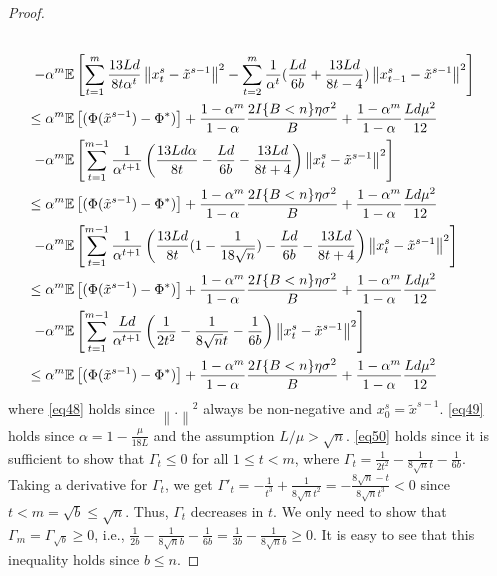 \documentclass{article}
\newcommand*{\E}{\mathbb{E}}
\newcommand{\norm}[1]{\left\lVert#1\right\rVert}
\theoremstyle{definition}
\theoremstyle{remark}
\begin{document}
\begin{proof}
{\begin{align}
\\-\alpha^m\E&\left[\sum_{t=1}^m\frac{13Ld}{8t\alpha^t}\norm{{x}_t^s-\tilde{x}^{s-1}}^2-\sum_{t=2}^m\frac{1}{\alpha^t}(\frac{Ld}{6b}+\frac{13Ld}{8t-4}) \norm{x_{t-1}^s-\tilde{x}^{s-1}}^2 \right]\label{eq48}\\
\leq\alpha^m\E&\left[(\Phi(\tilde{x}^{s-1}) - \Phi^*)\right] + \frac{1-\alpha^m}{1-\alpha}\frac{2I\{B < n\}\eta \sigma ^2}{B}+\frac{1-\alpha^m}{1-\alpha}\frac{L d \mu^2}{12}\notag
\\-\alpha^m\E&\left[\sum_{t=1}^{m-1}\frac{1}{\alpha^{t+1}}\left(\frac{13Ld\alpha}{8t}-\frac{Ld}{6b} - \frac{13Ld}{8t+4}\right) \norm{x_{t}^s-\tilde{x}^{s-1}}^2 \right]\notag\\
\leq\alpha^m\E&\left[(\Phi(\tilde{x}^{s-1}) - \Phi^*)\right] + \frac{1-\alpha^m}{1-\alpha}\frac{2I\{B < n\}\eta \sigma ^2}{B}+\frac{1-\alpha^m}{1-\alpha}\frac{L d \mu^2}{12}\notag
\\-\alpha^m\E&\left[\sum_{t=1}^{m-1}\frac{1}{\alpha^{t+1}}\left(\frac{13Ld}{8t}(1-\frac{1}{18\sqrt{n}})-\frac{Ld}{6b} - \frac{13Ld}{8t+4}\right) \norm{x_{t}^s-\tilde{x}^{s-1}}^2 \right]\label{eq49}\\
\leq\alpha^m\E&\left[(\Phi(\tilde{x}^{s-1}) - \Phi^*)\right] + \frac{1-\alpha^m}{1-\alpha}\frac{2I\{B < n\}\eta \sigma ^2}{B}+\frac{1-\alpha^m}{1-\alpha}\frac{L d \mu^2}{12}\notag
\\-\alpha^m\E&\left[\sum_{t=1}^{m-1}\frac{Ld}{\alpha^{t+1}}\left(\frac{1}{2t^2}-\frac{1}{8\sqrt{n}t}-\frac{1}{6b} \right) \norm{x_{t}^s-\tilde{x}^{s-1}}^2 \right]\notag\\
\leq\alpha^m\E&\left[(\Phi(\tilde{x}^{s-1}) - \Phi^*)\right] + \frac{1-\alpha^m}{1-\alpha}\frac{2I\{B < n\}\eta \sigma ^2}{B}+\frac{1-\alpha^m}{1-\alpha}\frac{L d \mu^2}{12}\label{eq50}
\end{align}
}
where \eqref{eq48} holds since $\norm{.}^2$ always be non-negative and $x_0^s=\tilde{x}^{s-1}$. \eqref{eq49} holds since $\alpha = 1 - \frac{\mu}{18L}$ and the assumption $L/\mu > \sqrt{n}$. \eqref{eq50} holds since it is sufficient to show that $\Gamma_t \leq 0$ for all $1\leq t < m$, where 
$\Gamma_t = \frac{1}{2t^2} - \frac{1}{8\sqrt{n} t}-\frac{1}{6b}$. Taking a derivative for $\Gamma_t$, we get $\Gamma'_t = -\frac{1}{t^3}+\frac{1}{8\sqrt{n}t^2} = -\frac{8\sqrt{n}-t}{8\sqrt{n}t^3} < 0$ since $t<m = \sqrt{b}\leq \sqrt{n}$. Thus, $\Gamma_t$ decreases in $t$. We only need to show that $\Gamma_m = \Gamma_{\sqrt{b}}\geq 0$, i.e., $\frac{1}{2b} - \frac{1}{8\sqrt{n}b} - \frac{1}{6b} = \frac{1}{3b} - \frac{1}{8\sqrt{n}b}\geq 0$. It is easy to see that this inequality holds since $b\leq n$. 


\end{proof}
\end{document}
